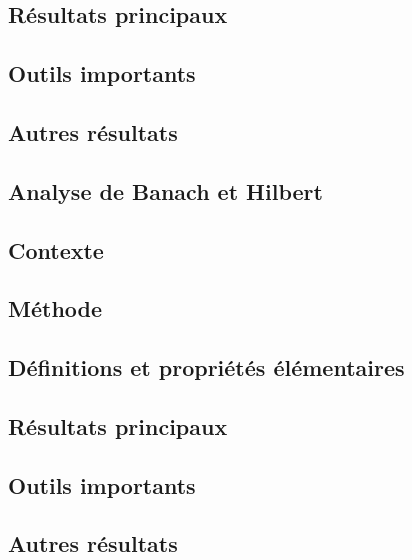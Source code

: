 \documentclass[11pt,a4paper]{article}
\begin{document}
\subsection*{Résultats principaux}

\subsection*{Outils importants}

\subsection*{Autres résultats}


\newpage
\begin{center}  
\section*{Analyse de Banach et Hilbert} 
\end{center}


\subsection*{Contexte}

\subsection*{Méthode}

\subsection*{Définitions et propriétés élémentaires}

\subsection*{Résultats principaux}

\subsection*{Outils importants}


\subsection*{Autres résultats}
\end{document}
